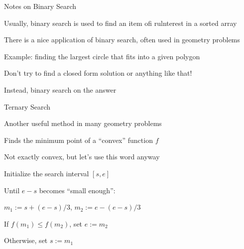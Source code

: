 \documentclass[13pt,onlymath]{beamer}
\begin{document}
\begin{frame}{Notes on Binary Search}
\BIT
\item Usually, binary search is used to find an item ofi rulnterest in a sorted array
\vfill
\item There is a nice application of binary search, often used in geometry problems
\BIT
\item Example: finding the largest circle that fits into a given polygon
\BIT
\item Don't try to find a closed form solution or anything like that!
\item Instead, binary search on the answer
\EIT\EIT
\EIT
\end{frame}

\begin{frame}{Ternary Search}
\BIT
\item Another useful method in many geometry problems
\item Finds the minimum point of a ``convex'' function $f$
\BIT
\item Not exactly convex, but let's use this word anyway
\EIT
\item Initialize the search interval $[s, e]$
\item Until $e-s$ becomes ``small enough'':
\BIT
\item $m_1 := s+(e-s)/3$, $m_2 := e - (e-s)/3$
\item If $f(m_1) \le f(m_2)$, set $e := m_2$
\item Otherwise, set $s := m_1$
\EIT\EIT
\end{frame}
\end{document}
